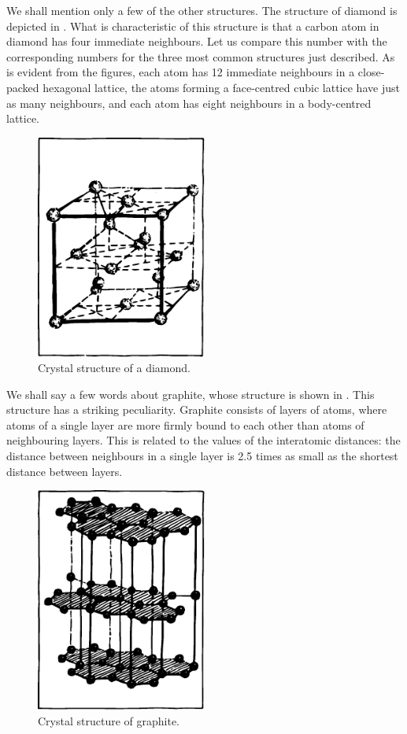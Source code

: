 We shall mention only a few of the other structures. The structure of diamond is depicted in . What is characteristic of this structure is that a carbon atom in diamond has four immediate neighbours. Let us compare this number with the corresponding numbers for the three most common structures just described. As is evident from the figures, each atom has 12 immediate neighbours in a close-packed hexagonal lattice, the atoms forming a face-centred cubic lattice have just as many neighbours, and each atom has eight neighbours in a body-centred lattice.

\begin{figure}[!ht]
\centering
\includegraphics[width=0.5\textwidth]{figures/fig-02-17.pdf}
\caption{Crystal structure of a diamond.}
\label{fig-2.17}
\end{figure}

We shall say a few words about graphite, whose struc­ture is shown in . This structure has a striking peculiarity. Graphite consists of layers of atoms, where atoms of a single layer are more firmly bound to each other than atoms of neighbouring layers. This is related to the values of the interatomic distances: the distance between neighbours in a single layer is 2.5 times as small as the shortest distance between layers.

\begin{figure}[!ht]
\centering
\includegraphics[width=0.5\textwidth]{figures/fig-02-18.pdf}
\caption{Crystal structure of graphite.}
\label{fig-2.18}
\end{figure}

